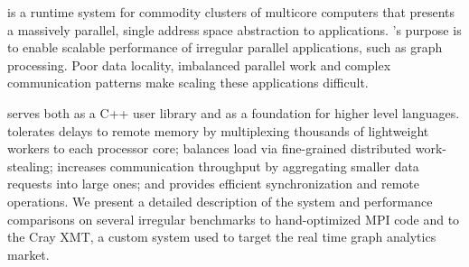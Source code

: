 \Grappa is a runtime system for commodity clusters of multicore computers that
presents a massively parallel, single address space abstraction to
applications. \Grappa's purpose is to enable scalable performance of irregular
parallel applications, such as graph processing. Poor data locality,
imbalanced parallel work and complex communication patterns make scaling these
applications difficult.

\Grappa serves both as a C++ user library and as a foundation for higher level
languages. \Grappa tolerates delays to remote memory by multiplexing thousands
of lightweight workers to each processor core; balances load via fine-grained
distributed work-stealing; increases communication throughput by aggregating
smaller data requests into large ones; and provides efficient synchronization
and remote operations. We present a detailed description of the \Grappa system
and performance comparisons on several irregular benchmarks to hand-optimized
MPI code and to the Cray XMT, a custom system used to target the real time
graph analytics market.
